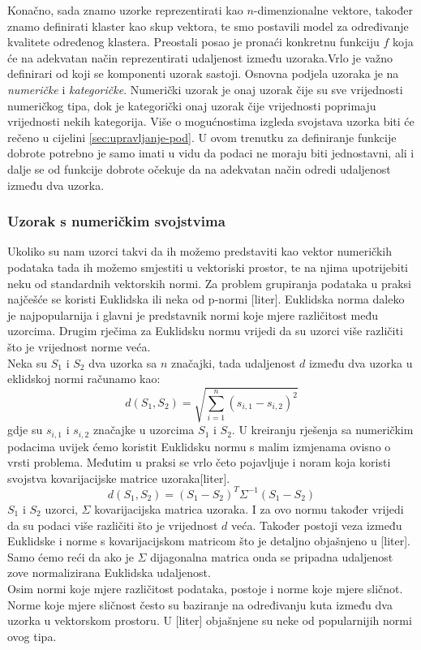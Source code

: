 \documentclass[a4paper,twoside,12pt]{memoir} %
\begin{document}
Konačno, sada znamo uzorke reprezentirati kao $n$-dimenzionalne vektore, također znamo definirati klaster kao skup vektora, te smo postavili model za određivanje kvalitete određenog klastera. Preostali posao je pronaći konkretnu funkciju $f$ koja će na adekvatan način reprezentirati udaljenost između uzoraka.Vrlo je važno definirari od koji se komponenti uzorak sastoji. Osnovna podjela uzoraka je na \textit{numeričke} i \textit{kategoričke}. Numerički uzorak je onaj uzorak čije su sve vrijednosti numeričkog tipa, dok je kategorički onaj uzorak čije vrijednosti poprimaju vrijednosti nekih kategorija. Više o mogućnostima izgleda svojstava uzorka biti će rečeno u cijelini \ref{sec:upravljanje-pod}. U ovom trenutku za definiranje funkcije dobrote potrebno je samo imati u vidu da podaci ne moraju biti jednostavni, ali i dalje se od funkcije dobrote očekuje da na adekvatan način odredi udaljenost između dva uzorka.
\subsubsection{Uzorak s numeričkim svojstvima}
Ukoliko su nam uzorci takvi da ih možemo predstaviti kao vektor numeričkih podataka tada ih možemo smjestiti u vektoriski prostor, te na njima upotrijebiti neku od standardnih vektorskih normi. Za problem grupiranja podataka u praksi najčešće se koristi Euklidska ili neka od p-normi [liter]. 
Euklidska norma daleko je najpopularnija i glavni je predstavnik normi koje mjere različitost među uzorcima. Drugim rječima za Euklidsku normu vrijedi da su uzorci više različiti što je vrijednost norme veća. \\
Neka su $S_1$ i $S_2$ dva uzorka sa $n$ značajki, tada udaljenost $d$ između dva uzorka u eklidskoj normi računamo kao:
\begin{equation}
\label{equ:metrika-num}
d(S_1,S_2) = \sqrt{\sum_{i=1}^{n}(s_{i,1} -s_{i,2})^2}
\end{equation}
gdje su $s_{i,1}$ i $s_{i,2}$ značajke u uzorcima $S_1$ i $S_2$. U kreiranju rješenja sa numeričkim podacima uvijek ćemo koristit Euklidsku normu s malim izmjenama ovisno o vrsti problema. Međutim u praksi se vrlo četo pojavljuje i noram koja koristi svojstva kovarijacijske matrice uzoraka[liter]. 
\begin{equation}
d(S_1,S_2) = (S_1-S_2)^T\Sigma^{-1}(S_1-S_2)
\end{equation}
$S_1$ i $S_2$ uzorci, $\Sigma $ kovarijacijska matrica uzoraka. I za ovo normu također vrijedi da su podaci više različiti što je vrijednost $d$ veća. Također postoji veza između Euklidske i norme s kovarijacijskom matricom što je detaljno objašnjeno u [liter]. Samo ćemo reći da ako je $\Sigma$ dijagonalna matrica onda se pripadna udaljenost zove normalizirana Euklidska udaljenost.\\
Osim normi koje mjere različitost podataka, postoje i norme koje mjere sličnot. Norme koje mjere sličnost često su baziranje na određivanju kuta između dva uzorka u vektorskom prostoru. U [liter] objašnjene su neke od popularnijih normi ovog tipa.
\end{document}
